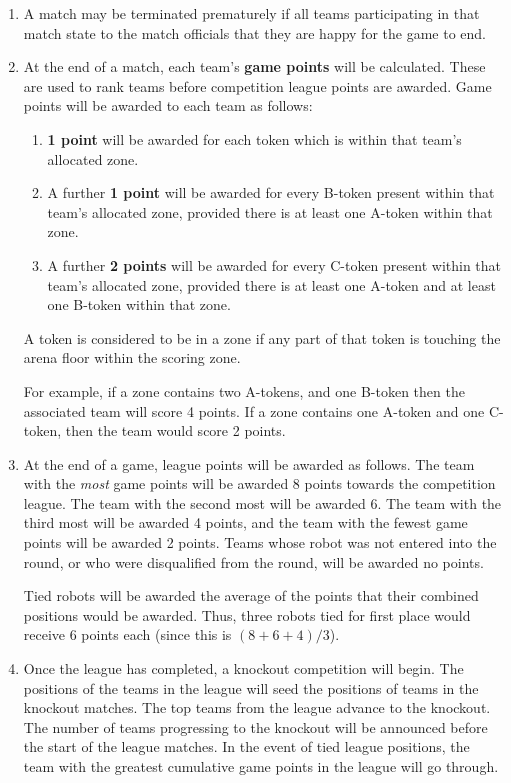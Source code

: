 \begin{enumerate}
\item A match may be terminated prematurely if all teams participating in that match state to the match officials that they are happy for the game to end.

\item At the end of a match, each team's \textbf{game points} will be calculated.  These are used to rank teams before competition league points are awarded.  Game points will be awarded to each team as follows:
  \begin{enumerate}
  \item \textbf{1 point} will be awarded for each token which is within that team's allocated zone.
  \item A further \textbf{1 point} will be awarded for every B-token present within that team's allocated zone, provided there is at least one A-token within that zone.
  \item A further \textbf{2 points} will be awarded for every C-token present within that team's allocated zone, provided there is at least one A-token and at least one B-token within that zone.
  \end{enumerate}
  A token is considered to be in a zone if any part of that token is touching the arena floor within the scoring zone.

  For example, if a zone contains two A-tokens, and one B-token then the associated team will score 4 points.  If a zone contains one A-token and one C-token, then the team would score 2 points.

\item At the end of a game, league points will be awarded as follows.
      The team with the \emph{most} game points will be awarded 8 points towards the competition league.
      The team with the second most will be awarded 6.
      The team with the third most will be awarded 4 points, and the team with the fewest game points will be awarded 2 points.
      Teams whose robot was not entered into the round, or who were disqualified from the round, will be awarded no points.

      Tied robots will be awarded the average of the points that their combined positions would be awarded.
      Thus, three robots tied for first place would receive 6 points each (since this is $(8+6+4)/3$).

\item Once the league has completed, a knockout competition will begin.
      The positions of the teams in the league will seed the positions of teams in the knockout matches.
      The top teams from the league advance to the knockout.
      The number of teams progressing to the knockout will be announced before the start of the league matches.
      In the event of tied league positions, the team with the greatest cumulative game points in the league will go through.


\end{enumerate}
